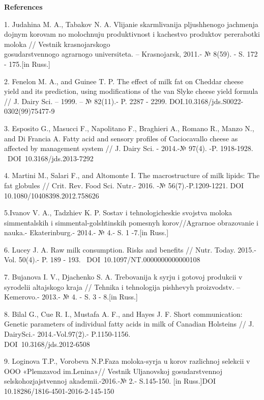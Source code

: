 \begin{center}
{\bfseries References}
\end{center}

\begin{noparindent}

1. Judahina M. A., Tabakov N. A. Vlijanie skarmlivanija pljushhenogo
jachmenja dojnym korovam no molochnuju produktivnost\textquotesingle{} i
kachestvo produktov pererabotki moloka // Vestnik krasnojarskogo
\\gosudarstvennogo agrarnogo universiteta. -- Krasnojarsk, 2011.- № 8(59).
- S. 172 - 175.{[}in Russ.{]}

2. Fenelon M. A., and Guinee T. P. The effect of milk fat on Cheddar
cheese yield and its prediction, using modifications of the van Slyke
cheese yield formula // J. Dairy Sci. -- 1999. -- № 82(11).- P. 2287 -
2299. DOI.10.3168/jds.S0022-0302(99)75477-9

3. Esposito G., Masucci F., Napolitano F., Braghieri A., Romano R.,
Manzo N., and Di Francia A. Fatty acid and sensory profiles of
Caciocavallo cheese as affected by management system // J. Dairy Sci. -
2014.-№ 97(4). -P. 1918-1928. ~DOI~10.3168/jds.2013-7292

4. Martini M., Salari F., and Altomonte I. The macrostructure of milk
lipids: The fat globules // Crit. Rev. Food Sci. Nutr.- 2016. -№
56(7).-P.1209-1221. DOI 10.1080/10408398.2012.758626

5.Ivanov V. A., Tadzhiev K. P. Sostav i tehnologicheskie svojstva moloka
simmental\textquotesingle skih i simmental-golshtinskih pomesnyh
korov//Agrarnoe obrazovanie i nauka.- Ekaterinburg.- 2014.- № 4.- S. 1
-7.{[}in Russ.{]}

6. Lucey J. A. Raw milk consumption. Risks and benefits // Nutr. Today.
2015.-Vol. 50(4).- P. 189 - 193. ~DOI~10.1097/NT.0000000000000108

7. Bujanova I. V., D\textquotesingle jachenko S. A. Trebovanija k
syr\textquotesingle ju i gotovoj produkcii v syrodelii altajskogo kraja
// Tehnika i tehnologija pishhevyh proizvodstv. --Kemerovo.- 2013.- № 4.
- S. 3 - 8.{[}in Russ.{]}

8. Bilal G., Cue R. I., Mustafa A. F., and Hayes J. F. Short
communication: Genetic parameters of individual fatty acids in milk of
Canadian Holsteins // J. DairySci.- 2014.-Vol.97(2).- P.1150-1156.
\\DOI~10.3168/jds.2012-6508

9. Loginova T.P., Vorob\textquotesingle eva N.P.Faza
moloka-syr\textquotesingle ja u korov razlichnoj selekcii v OOO
«Plemzavod im.Lenina»// Vestnik Ul\textquotesingle janovskoj
gosudarstvennoj sel\textquotesingle skohozjajstvennoj akademii.-2016.-№
2.- S.145-150. {[}in Russ.{]}DOI 10.18286/1816-4501-2016-2-145-150


\end{noparindent}
